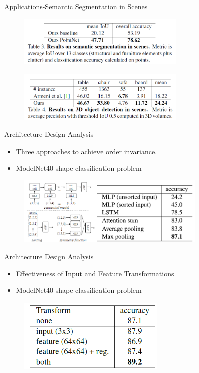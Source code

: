 \documentclass[serif,mathserif]{beamer}
\begin{document}
\begin{frame}{Applications-Semantic Segmentation in Scenes}
	\begin{figure}
		\includegraphics[width=8cm]{image/scencs1.png}
	\end{figure}
	\begin{figure}
		\includegraphics[width=8cm]{image/scencs2.png}
	\end{figure}
\end{frame}

\begin{frame}{Architecture Design Analysis}
	\begin{itemize}
		\item Three approaches to achieve order invariance.
		\item ModelNet40 shape classification problem
	\end{itemize}
	\begin{figure}
		\includegraphics[width=9cm]{image/arch.png}
	\end{figure}
\end{frame}

\begin{frame}{Architecture Design Analysis}
	\begin{itemize}
		\item Effectiveness of Input and Feature Transformations
		\item ModelNet40 shape classification problem
	\end{itemize}
	\begin{figure}
		\includegraphics[width=7cm]{image/arch2.png}
	\end{figure}
\end{frame}
\end{document}
